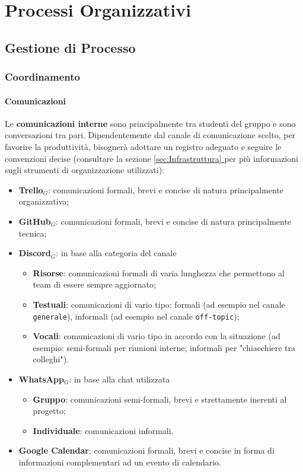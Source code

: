 \chapter{Processi Organizzativi}

\section{Gestione di Processo}

\subsection{Coordinamento}

\subsubsection{Comunicazioni}
Le \textbf{comunicazioni interne} sono principalmente tra studenti del gruppo e sono conversazioni tra pari. Dipendentemente dal canale di comunicazione scelto, per favorire la produttività, bisognerà adottare un registro adeguato e seguire le convenzioni decise (consultare la sezione \underline{\ref{sec:Infrastruttura} } per più informazioni sugli strumenti di organizzazione utilizzati):
\begin{itemize}
  \item \textbf{Trello}$_G$: comunicazioni formali, brevi e concise di natura principalmente organizzativa;
  \item \textbf{GitHub}$_G$: comunicazioni formali, brevi e concise di natura principalmente tecnica;
  \item \textbf{Discord}$_G$: in base alla categoria del canale
  \begin{itemize}
    \item \textbf{Risorse}: comunicazioni formali di varia lunghezza che permettono al team di essere sempre aggiornato;
    \item \textbf{Testuali}: comunicazioni di vario tipo: formali (ad esempio nel canale \texttt{generale}), informali (ad esempio nel canale \texttt{off-topic});
    \item \textbf{Vocali}: comunicazioni di vario tipo in accordo con la situazione (ad esempio: semi-formali per riunioni interne; informali per "chiacchiere tra colleghi").
  \end{itemize}
  \item \textbf{WhatsApp}$_G$: in base alla chat utilizzata
  \begin{itemize}
    \item \textbf{Gruppo}: comunicazioni semi-formali, brevi e strettamente inerenti al progetto;
    \item \textbf{Individuale}: comunicazioni informali.
  \end{itemize}
  \item \textbf{Google Calendar}: comunicazioni formali, brevi e concise in forma di informazioni complementari ad un evento di calendario.
\end{itemize}

